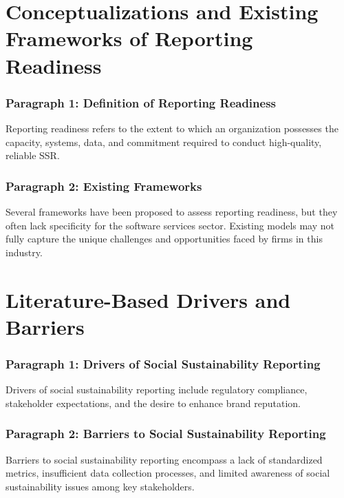 \section{Conceptualizations and Existing Frameworks of Reporting Readiness}
\subsubsection{Paragraph 1: Definition of Reporting Readiness}
Reporting readiness refers to the extent to which an organization possesses the capacity, systems, data,
and commitment required to conduct high-quality, reliable SSR.

\subsubsection{Paragraph 2: Existing Frameworks}
Several frameworks have been proposed to assess reporting readiness, 
but they often lack specificity for the software services sector. 
Existing models may not fully capture the unique challenges and opportunities faced by firms in this industry.

\section{Literature-Based Drivers and Barriers}
\subsubsection{Paragraph 1: Drivers of Social Sustainability Reporting}
Drivers of social sustainability reporting include regulatory compliance, stakeholder expectations, 
and the desire to enhance brand reputation.

\subsubsection{Paragraph 2: Barriers to Social Sustainability Reporting}
Barriers to social sustainability reporting encompass a lack of standardized metrics, 
insufficient data collection processes, and limited awareness of social sustainability issues among key stakeholders.
